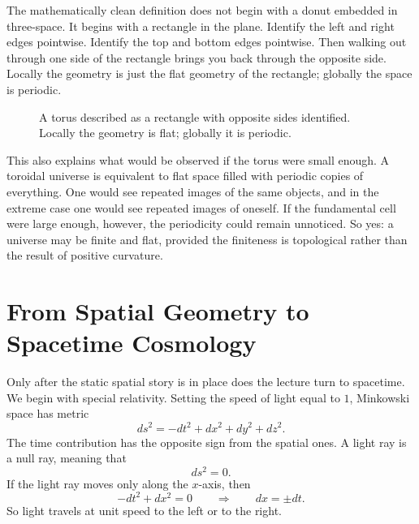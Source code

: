 The mathematically clean definition does not begin with a donut embedded in three-space. It begins with a rectangle in the plane. Identify the left and right edges pointwise. Identify the top and bottom edges pointwise. Then walking out through one side of the rectangle brings you back through the opposite side. Locally the geometry is just the flat geometry of the rectangle; globally the space is periodic.

\begin{figure}[htbp]
\centering
{}
\caption{A torus described as a rectangle with opposite sides identified. Locally the geometry is flat; globally it is periodic.}
\end{figure}

This also explains what would be observed if the torus were small enough. A toroidal universe is equivalent to flat space filled with periodic copies of everything. One would see repeated images of the same objects, and in the extreme case one would see repeated images of oneself. If the fundamental cell were large enough, however, the periodicity could remain unnoticed. So yes: a universe may be finite and flat, provided the finiteness is topological rather than the result of positive curvature.

\section{From Spatial Geometry to Spacetime Cosmology}

Only after the static spatial story is in place does the lecture turn to spacetime. We begin with special relativity. Setting the speed of light equal to \(1\), Minkowski space has metric
\begin{equation}
ds^2 = -dt^2 + dx^2 + dy^2 + dz^2.
\end{equation}
The time contribution has the opposite sign from the spatial ones. A light ray is a null ray, meaning that
\begin{equation}
ds^2 = 0.
\end{equation}
If the light ray moves only along the \(x\)-axis, then
\begin{equation}
-dt^2 + dx^2 = 0
\qquad\Rightarrow\qquad
dx = \pm dt.
\end{equation}
So light travels at unit speed to the left or to the right.

